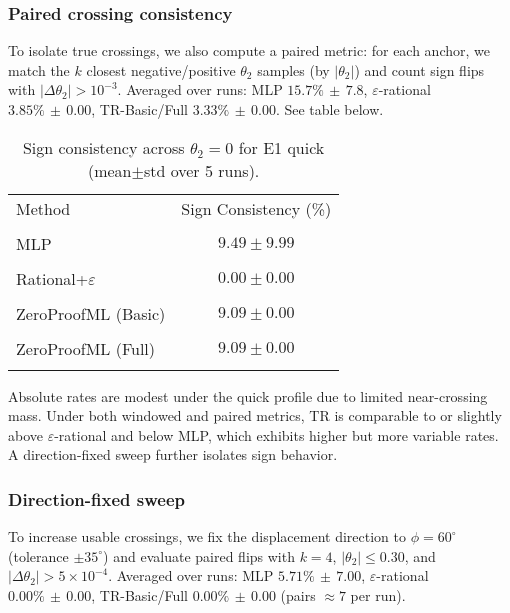 \documentclass[11pt,twoside]{article}
\begin{document}
\subsubsection{Paired crossing consistency}

To isolate true crossings, we also compute a paired metric: for each anchor, we match the $k$ closest negative/positive $\theta_2$ samples (by $|\theta_2|$) and count sign flips with $|\Delta\theta_2|>10^{-3}$. Averaged over runs: MLP $15.7\%\,\pm\,7.8$, $\varepsilon$-rational $3.85\%\,\pm\,0.00$, TR-Basic/Full $3.33\%\,\pm\,0.00$. See table below.


\begin{table}[h]
  \centering
  \small
  \begin{tabular}{lc}
    \toprule
    Method & Sign Consistency (\%) \\\\
    \midrule
    MLP & $9.49 \pm 9.99$ \\\\
    Rational+$\varepsilon$ & $0.00 \pm 0.00$ \\\\
    ZeroProofML (Basic) & $9.09 \pm 0.00$ \\\\
    ZeroProofML (Full) & $9.09 \pm 0.00$ \\\\
    \bottomrule
  \end{tabular}
  \caption{Sign consistency across $\theta_2=0$ for E1 quick (mean$\pm$std over 5 runs).}
\end{table}

\noindent Absolute rates are modest under the quick profile due to limited near-crossing mass. Under both windowed and paired metrics, TR is comparable to or slightly above $\varepsilon$-rational and below MLP, which exhibits higher but more variable rates. A direction-fixed sweep further isolates sign behavior.

\subsubsection{Direction-fixed sweep}

To increase usable crossings, we fix the displacement direction to $\phi=60^{\circ}$ (tolerance $\pm35^{\circ}$) and evaluate paired flips with $k=4$, $|\theta_2|\le0.30$, and $|\Delta\theta_2|>5\times10^{-4}$. Averaged over runs: MLP $5.71\%\,\pm\,7.00$, $\varepsilon$-rational $0.00\%\,\pm\,0.00$, TR-Basic/Full $0.00\%\,\pm\,0.00$ (pairs $\approx7$ per run).
\end{document}

